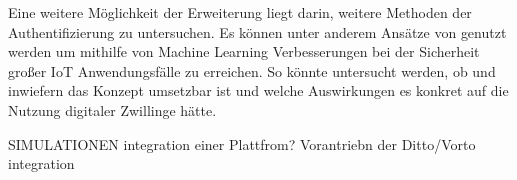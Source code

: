 \documentclass[
	12pt,
	BCOR=5mm,
	DIV=12,
	headinclude=on,
	footinclude=off,
	parskip=half,
	bibliography=totoc,
	listof=entryprefix,
	toc=listof,
	numbers=noenddot,
	plainfootsepline
]{scrreprt}
\begin{document}
Eine weitere Möglichkeit der Erweiterung liegt darin, weitere Methoden der Authentifizierung zu untersuchen. Es können unter anderem Ansätze von \citeauthor{fang2020fast} genutzt werden um mithilfe von Machine Learning Verbesserungen bei der Sicherheit großer IoT Anwendungsfälle zu erreichen. \autocite{fang2020fast} So könnte untersucht werden, ob und inwiefern das Konzept umsetzbar ist und welche Auswirkungen es konkret auf die Nutzung digitaler Zwillinge hätte. 

SIMULATIONEN integration einer Plattfrom?
Vorantriebn der Ditto/Vorto integration

\clearpage
\ihead{}
\printbibliography[title=Literaturverzeichnis]
\cleardoublepage

\end{document}
